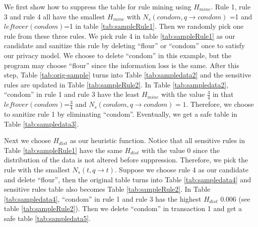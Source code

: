 {We first show how to suppress the table for rule mining using $H_{mine}$.
Rule 1, rule 3 and rule 4 all have the smallest $H_{mine}$ with $N_s(condom, q\rightarrow condom)$ =1 and $leftover(condom)$=1 in table \ref{tab:sampleRule1}. Then we randomly pick one rule from these three rules. We pick rule 4
in table \ref{tab:sampleRule1} as our candidate and
sanitize this rule by deleting ``flour'' or ``condom'' once to satisfy our privacy model. We choose to delete ``condom'' in this example, but the program may choose ``flour''
since the information loss is the same.
After this step, Table \ref{tab:orig-sample} turns into
Table \ref{tab:sampledata2} and the sensitive rules are updated in
Table \ref{tab:sampleRule2}. In Table \ref{tab:sampledata2},
``condom'' in rule 1 and rule 3 have the least $H_{mine}$ with
the value $\frac{3}{4}$ in that $leftover(condom)$=$\frac{3}{4}$ and
$N_s(condom, q\rightarrow condom)=1$. Therefore, we choose to
sanitize rule 1 by eliminating ``condom''.
Eventually, we get a safe table in Table \ref{tab:sampledata3}.

Next we choose $H_{dist}$ as our heuristic function.
Notice that all sensitive rules in Table  \ref{tab:sampleRule1}
have the same $H_{dist}$ with the value 0 since the
distribution of the data is not altered before suppression.
Therefore, we pick the rule with the smallest
 $N_s(t, q\rightarrow t)$. Suppose we choose rule 4 as our candidate and
delete ``flour'', then the original table turns into
Table \ref{tab:sampledata4} and sensitive rules
table also becomes Table \ref{tab:sampleRule2}.
In Table \ref{tab:sampledata4}, ``condom'' in rule 1 and rule 3 has
 the highest $H_{dist}$ 0.006 (see table \ref{tab:sampleRule2}). Then we delete ``condom'' in transaction 1 and get a safe table \ref{tab:sampledata5}.
}%
%
%
